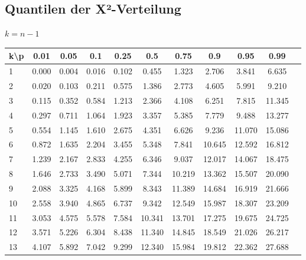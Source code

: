 \subsection{Quantilen der X²-Verteilung}
$k = n -1$\\
\begin{tabular}{|g|c|c|c|c|c|c|c|c|c|c|}
    \hline
    k\textbackslash p & 0.01    & 0.05    & 0.1     & 0.25    & 0.5     & 0.75     & 0.9      & 0.95     & 0.99     \\
                     & 0.000   & 0.004   & 0.016   & 0.102   & 0.455   & 1.323    & 2.706    & 3.841    & 6.635    \\
    2                 & 0.020   & 0.103   & 0.211   & 0.575   & 1.386   & 2.773    & 4.605    & 5.991    & 9.210    \\
    3                 & 0.115   & 0.352   & 0.584   & 1.213   & 2.366   & 4.108    & 6.251    & 7.815    & 11.345   \\
    4                 & 0.297   & 0.711   & 1.064   & 1.923   & 3.357   & 5.385    & 7.779    & 9.488    & 13.277   \\
    5                 & 0.554   & 1.145   & 1.610   & 2.675   & 4.351   & 6.626    & 9.236    & 11.070   & 15.086   \\
    6                 & 0.872   & 1.635   & 2.204   & 3.455   & 5.348   & 7.841    & 10.645   & 12.592   & 16.812   \\
    7                 & 1.239   & 2.167   & 2.833   & 4.255   & 6.346   & 9.037    & 12.017   & 14.067   & 18.475   \\
    8                 & 1.646   & 2.733   & 3.490   & 5.071   & 7.344   & 10.219   & 13.362   & 15.507   & 20.090   \\
    9                 & 2.088   & 3.325   & 4.168   & 5.899   & 8.343   & 11.389   & 14.684   & 16.919   & 21.666   \\
    10                & 2.558   & 3.940   & 4.865   & 6.737   & 9.342   & 12.549   & 15.987   & 18.307   & 23.209   \\
    11                & 3.053   & 4.575   & 5.578   & 7.584   & 10.341  & 13.701   & 17.275   & 19.675   & 24.725   \\
    12                & 3.571   & 5.226   & 6.304   & 8.438   & 11.340  & 14.845   & 18.549   & 21.026   & 26.217   \\
    13                & 4.107   & 5.892   & 7.042   & 9.299   & 12.340  & 15.984   & 19.812   & 22.362   & 27.688   \\

\end{tabular}
